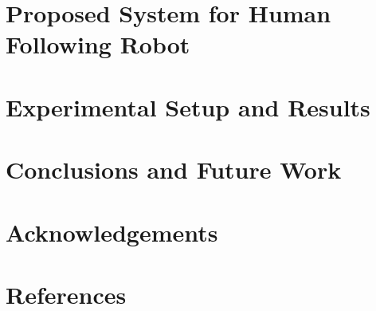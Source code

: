 \documentclass[12pt, oneside]{book}
\newcommand\blankpage{%
    \null
    \thispagestyle{empty}%
    \addtocounter{page}{-1}%
    \newpage}
\begin{document}
\chapter{Proposed System for Human Following Robot}
\label{Chap:Proposed_system}


\chapter{Experimental Setup and Results}
\label{Chap:ExperimentSetup_Results}


\chapter{Conclusions and Future Work}
\label{Chap:Conclusion_FutureWork}




% 

% 

% 


% 


\chapter{Acknowledgements}


\chapter{References}
\nocite{*}
\printbibliography[heading=none]
\end{document}
